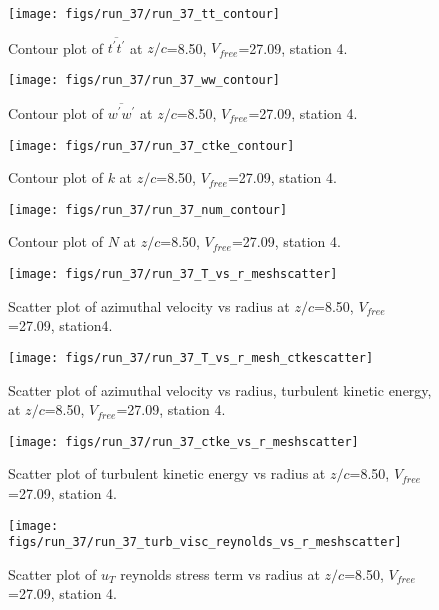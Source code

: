 \begin{figure}[H]
\centering
\texttt{[image: figs/run\_37/run\_37\_tt\_contour]}
\caption{Contour plot of $\overline{t^\prime t^\prime}$ at $z/c$=8.50, $V_{free}$=27.09, station 4.}
\end{figure}


\begin{figure}[H]
\centering
\texttt{[image: figs/run\_37/run\_37\_ww\_contour]}
\caption{Contour plot of $\overline{w^\prime w^\prime}$ at $z/c$=8.50, $V_{free}$=27.09, station 4.}
\end{figure}


\begin{figure}[H]
\centering
\texttt{[image: figs/run\_37/run\_37\_ctke\_contour]}
\caption{Contour plot of $k$ at $z/c$=8.50, $V_{free}$=27.09, station 4.}
\end{figure}


\begin{figure}[H]
\centering
\texttt{[image: figs/run\_37/run\_37\_num\_contour]}
\caption{Contour plot of $N$ at $z/c$=8.50, $V_{free}$=27.09, station 4.}
\end{figure}


\begin{figure}[H]
\centering
\texttt{[image: figs/run\_37/run\_37\_T\_vs\_r\_meshscatter]}
\caption{Scatter plot of azimuthal velocity vs radius at $z/c$=8.50, $V_{free}$=27.09, station4.}
\end{figure}


\begin{figure}[H]
\centering
\texttt{[image: figs/run\_37/run\_37\_T\_vs\_r\_mesh\_ctkescatter]}
\caption{Scatter plot of azimuthal velocity vs radius, turbulent kinetic energy, at $z/c$=8.50, $V_{free}$=27.09, station 4.}
\end{figure}


\begin{figure}[H]
\centering
\texttt{[image: figs/run\_37/run\_37\_ctke\_vs\_r\_meshscatter]}
\caption{Scatter plot of turbulent kinetic energy vs radius at $z/c$=8.50, $V_{free}$=27.09, station 4.}
\end{figure}


\begin{figure}[H]
\centering
\texttt{[image: figs/run\_37/run\_37\_turb\_visc\_reynolds\_vs\_r\_meshscatter]}
\caption{Scatter plot of $
u_T$ reynolds stress term vs radius at $z/c$=8.50, $V_{free}$=27.09, station 4.}
\end{figure}



